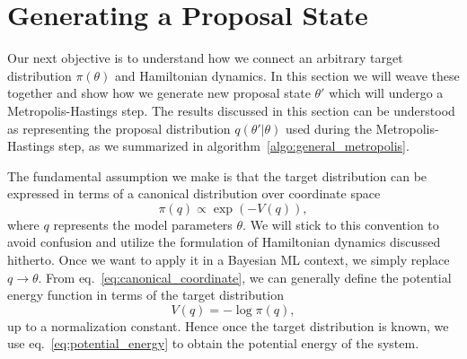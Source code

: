 \section{Generating a Proposal State}
Our next objective is to understand how we connect an arbitrary target distribution $\pi(\theta)$
and Hamiltonian dynamics. In this section we will weave these together and show how we
generate new proposal state $\theta'$ which will undergo a Metropolis-Hastings step.
The results discussed in this section can be understood as representing the proposal distribution $q(\theta'|\theta)$ used during the Metropolis-Hastings step,
as we summarized in algorithm~\ref{algo:general_metropolis}. 

The fundamental assumption we make is that the target distribution can be expressed in terms of a
canonical distribution over coordinate space
\begin{equation}\label{eq:canonical_coordinate}
  \pi(q) \propto \exp\left(-V(q)\right),
\end{equation}
where $q$ represents the model parameters $\theta$. We will stick to this convention to avoid confusion and 
utilize the formulation of Hamiltonian dynamics discussed hitherto. Once we want to apply it in a Bayesian ML context,
we simply replace $q \to \theta$. From eq.~\eqref{eq:canonical_coordinate}, we can generally define the potential
energy function in terms of the target distribution
\begin{equation}\label{eq:potential_energy}
  V(q) = - \log \pi(q),
\end{equation}
up to a normalization constant. Hence once the target distribution is known,
we use eq.~\eqref{eq:potential_energy} to obtain the potential energy of the system.

